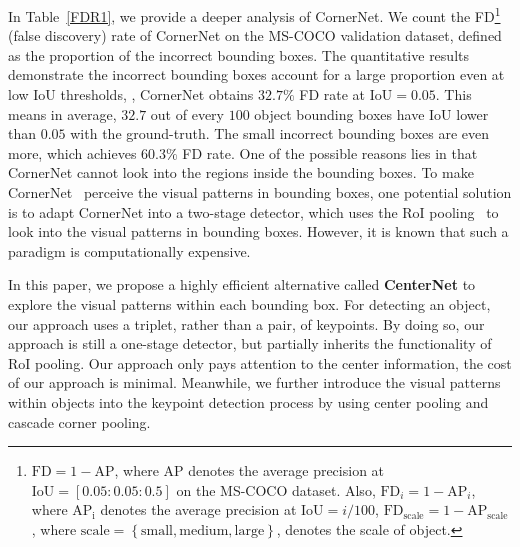 \documentclass[10pt,twocolumn,letterpaper]{article}
\begin{document}
In Table~\ref{FDR1}, we provide a deeper analysis of CornerNet. We count the FD\footnote{$\mathrm{FD}=1-\mathrm{AP}$, where AP denotes the average precision at $\mathrm{IoU = [0.05 : 0.05 : 0.5]}$ on the MS-COCO dataset. Also, $\mathrm{FD}_{i} = 1 - \mathrm{AP}_{i}$, where $\mathrm{AP_i}$ denotes the average precision at $\mathrm{IoU} = i/100$, $\mathrm{FD_{scale}} = 1 - \mathrm{AP_{scale}}$, where $\mathrm{scale} = \left\{\mathrm{small, medium, large}\right\}$, denotes the scale of object.} (false discovery) rate of CornerNet on the MS-COCO validation dataset, defined as the proportion of the incorrect bounding boxes. The quantitative results demonstrate the incorrect bounding boxes account for a large proportion even at low IoU thresholds, \eg, CornerNet obtains $32.7\%$ FD rate at $\mathrm{IoU = 0.05}$. This means in average, $32.7$  out of every $100$ object bounding boxes have IoU lower than $0.05$ with the ground-truth. The small incorrect bounding boxes are even more, which achieves $60.3\%$ FD rate. One of the possible reasons lies in that CornerNet cannot look into the regions inside the bounding boxes. To make CornerNet~\cite{law2018cornernet} perceive the visual patterns in bounding boxes, one potential solution is to adapt CornerNet into a two-stage detector, which uses the RoI pooling~\cite{girshick2015fast} to look into the visual patterns in bounding boxes. However, it is known that such a paradigm is computationally expensive.

In this paper, we propose a highly efficient alternative called \textbf{CenterNet} to explore the visual patterns within each bounding box.
For detecting an object, our approach uses a triplet, rather than a pair, of keypoints. By doing so, our approach is still a one-stage detector, but partially inherits the functionality of RoI pooling. Our approach only pays attention to the center information, the cost of our approach is minimal. Meanwhile, we further introduce the visual patterns within objects into the keypoint detection process by using center pooling and cascade corner pooling.
\end{document}
